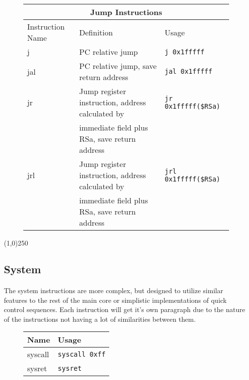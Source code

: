 \documentclass[letterpaper, 11pt]{article}
\begin{document}
\begin{figure}[!h]
	\begin{center}
		\begin{tabular}{|l|l|l|}
			\hline
			\multicolumn{3}{|c|}{Jump Instructions} \\ \hline
			Instruction Name	& Definition										& Usage 							\\ \hline
			j					& PC relative jump									& \texttt{j 0x1fffff}	\\ \hline
			jal					& PC relative jump, save return address 			& \texttt{jal	0x1fffff}	\\ \hline
			jr					& Jump register instruction, address calculated by	& \texttt{jr 0x1fffff(\$RSa)}	\\
			\hfill				& immediate field plus RSa, save return address		&		\hfill				\\ \hline
			jrl					& Jump register instruction, address calculated by	& \texttt{jrl 0x1fffff(\$RSa)}	\\ 
			\hfill				& immediate field plus RSa, save return address		&		\hfill				\\ \hline
		 		\end{tabular} 
	\end{center}
	
\end{figure}
\begin{center}
	\line(1,0){250}
\end{center}

\newpage

\subsection{System}
\paragraph{} The system instructions are more complex, but designed to utilize similar features to the rest of the main core or simplistic
implementations of quick control sequences. Each instruction will get it's own paragraph due to the nature of the instructions
not having a lot of similarities between them.


\begin{figure}[!h]
	\begin{center}
		\begin{tabular}{|l|l|}
			\hline
			Name		& Usage \\ \hline
			syscall		& \texttt{syscall 0xff}	\\ \hline
			sysret		& \texttt{sysret}	\\ \hline
		 		\end{tabular} 
	\end{center}
	
\end{figure}
\end{document}
